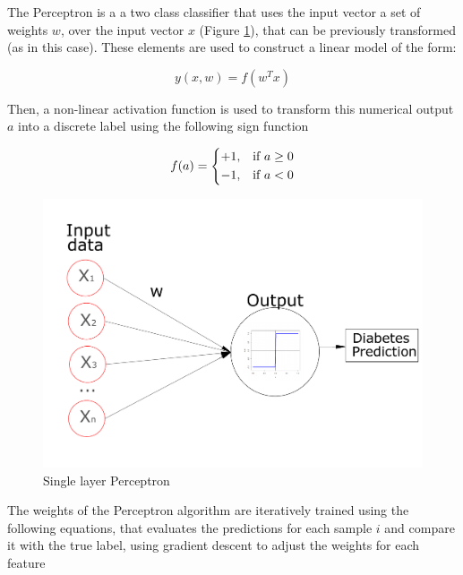 \documentclass[10pt,twocolumn,letterpaper]{article}
\begin{document}
The Perceptron is a a two class classifier that uses the input vector a set of weights $w$, over the input vector $x$ (Figure \ref{fig:perceptron}), that can be previously transformed \cite{Bishop2006} (as in this case). These elements are used to construct a linear model of the form:

\begin{equation}
	y(x,w) = f(w^T x)
\end{equation}

Then, a non-linear activation function is used to transform this numerical output $a$ into a discrete label using the following sign function \cite{Bishop2006}

\begin{equation}
f(a)= 
\begin{dcases}
+1,& \text{if } a\geq 0\\
-1,& \text{if } a< 0\\
\end{dcases}
\end{equation}


\begin{figure}[h]
	\begin{center}
		\includegraphics[width=1.0\linewidth]{Figura2.pdf}
	\end{center}
	\caption{Single layer Perceptron}
	\label{fig:perceptron}
\end{figure}


The weights of the Perceptron algorithm are iteratively trained using the following equations, that evaluates the predictions for each sample $i$ and compare it with the true label, using gradient descent to adjust the weights for each feature
\end{document}
